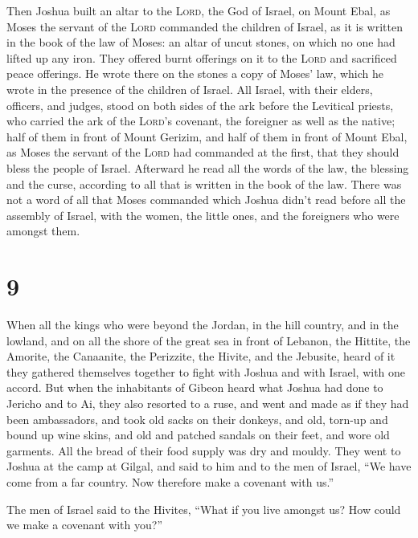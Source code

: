  Then Joshua built an altar to the \textsc{Lord}, the God
of Israel, on Mount Ebal,  as Moses the servant of the
\textsc{Lord} commanded the children of Israel, as it is written in the
book of the law of Moses: an altar of uncut stones, on which no one had
lifted up any iron. They offered burnt offerings on it to the
\textsc{Lord} and sacrificed peace offerings.  He wrote
there on the stones a copy of Moses' law, which he wrote in the presence
of the children of Israel.  All Israel, with their
elders, officers, and judges, stood on both sides of the ark before the
Levitical priests, who carried the ark of the \textsc{Lord}'s covenant,
the foreigner as well as the native; half of them in front of Mount
Gerizim, and half of them in front of Mount Ebal, as Moses the servant
of the \textsc{Lord} had commanded at the first, that they should bless
the people of Israel.  Afterward he read all the words of
the law, the blessing and the curse, according to all that is written in
the book of the law.  There was not a word of all that
Moses commanded which Joshua didn't read before all the assembly of
Israel, with the women, the little ones, and the foreigners who were
amongst them.

\hypertarget{section-8}{%
\section{9}\label{section-8}}

 When all the kings who were beyond the Jordan, in the
hill country, and in the lowland, and on all the shore of the great sea
in front of Lebanon, the Hittite, the Amorite, the Canaanite, the
Perizzite, the Hivite, and the Jebusite, heard of it  they
gathered themselves together to fight with Joshua and with Israel, with
one accord.  But when the inhabitants of Gibeon heard what
Joshua had done to Jericho and to Ai,  they also resorted
to a ruse, and went and made as if they had been ambassadors, and took
old sacks on their donkeys, and old, torn-up and bound up wine skins,
 and old and patched sandals on their feet, and wore old
garments. All the bread of their food supply was dry and mouldy.
 They went to Joshua at the camp at Gilgal, and said to
him and to the men of Israel, ``We have come from a far country. Now
therefore make a covenant with us.''

 The men of Israel said to the Hivites, ``What if you live
amongst us? How could we make a covenant with you?''

